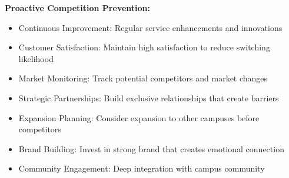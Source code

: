 \documentclass[a4paper,12pt]{article}
\begin{document}
\textbf{Proactive Competition Prevention:}
\begin{itemize}[leftmargin=2em]
    \item Continuous Improvement: Regular service enhancements and innovations
    \item Customer Satisfaction: Maintain high satisfaction to reduce switching likelihood
    \item Market Monitoring: Track potential competitors and market changes
    \item Strategic Partnerships: Build exclusive relationships that create barriers
    \item Expansion Planning: Consider expansion to other campuses before competitors
    \item Brand Building: Invest in strong brand that creates emotional connection
    \item Community Engagement: Deep integration with campus community
\end{itemize}

\vspace{1em}
\end{document}
